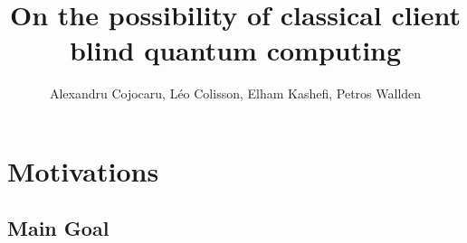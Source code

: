 \documentclass[]{beamer}
\title[Classically Driven Blind Quantum Computing]{On the possibility of classical client blind quantum computing}
\author{Alexandru Cojocaru, Léo Colisson, Elham Kashefi, Petros Wallden}
\begin{document}

\begin{frame}
  \titlepage
\end{frame}

\begin{frame}
  \tableofcontents
\end{frame}


\section{Motivations}

\subsection{Main Goal}
\end{document}
